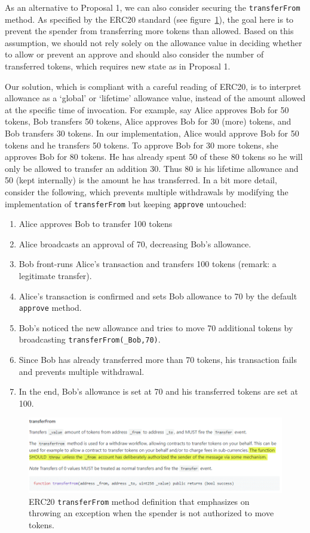 As an alternative to Proposal 1, we can also consider securing the \texttt{transferFrom} method. As specified by the ERC20 standard (see figure~\ref{fig:standard}), the goal here is to prevent the spender from transferring more tokens than allowed. Based on this assumption, we should not rely solely on the allowance value in deciding whether to allow or prevent an approve and should also consider the number of transferred tokens, which requires new state as in Proposal 1. 

Our solution, which is compliant with a careful reading of ERC20, is to interpret allowance as a `global' or `lifetime' allowance value, instead of the amount allowed at the specific time of invocation. For example, say Alice approves Bob for 50 tokens, Bob transfers 50 tokens, Alice approves Bob for 30 (more) tokens, and Bob transfers 30 tokens. In our implementation, Alice would approve Bob for 50 tokens and he transfers 50 tokens. To approve Bob for 30 more tokens, she approves Bob for 80 tokens. He has already spent 50 of these 80 tokens so he will only be allowed to transfer an addition 30. Thus 80 is his lifetime allowance and 50 (kept internally) is the amount he has transferred. In a bit more detail, consider the following, which prevents multiple withdrawals by modifying the implementation of \texttt{transferFrom} but keeping \texttt{approve} untouched:

\begin{enumerate}
	\item Alice approves Bob to transfer 100 tokens
	\item Alice broadcasts an approval of 70, decreasing Bob's allowance.
	\item Bob front-runs Alice’s transaction and transfers 100 tokens (remark: a legitimate transfer).
	\item Alice's transaction is confirmed and sets Bob allowance to 70 by the default \texttt{approve} method.
	\item Bob's noticed the new allowance and tries to move 70 additional tokens by broadcasting \texttt{transferFrom(\_Bob,70)}. 
	\item Since Bob has already transferred more than 70 tokens, his transaction fails and prevents multiple withdrawal. 
	\item In the end, Bob’s allowance is set at 70 and his transferred tokens are set at 100.
\end{enumerate}

\begin{figure}[t]
	\centering
	\includegraphics[width=1.0\linewidth]{figures/multiple_withdrawal_30.png}
	\caption{ERC20 \texttt{transferFrom} method definition that emphasizes on throwing an exception when the spender is not authorized to move tokens.\label{fig:standard}}
\end{figure}

